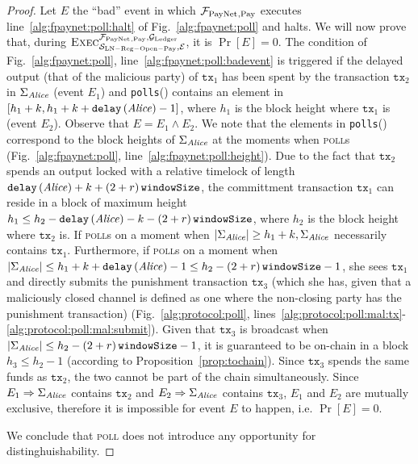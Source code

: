 \begin{proof}
  Let $E$ the ``bad'' event in which $\mathcal{F}_{\mathrm{PayNet}}{}_{\mathrm{, Pay}}$ executes
  line~\ref{alg:fpaynet:poll:halt} of Fig.~\ref{alg:fpaynet:poll} and halts. We
  will now prove that, during $\textsc{Exec}^{\mathcal{F}_{\mathrm{PayNet}}{}_{\mathrm{, Pay}},
  \mathcal{G}_{\mathrm{Ledger}}}_{\mathcal{S}_{\mathrm{LN - Reg - Open - Pay}}, \mathcal{E}}$, it is
  $\Pr[E] = 0$. The condition of Fig.~\ref{alg:fpaynet:poll},
  line~\ref{alg:fpaynet:poll:badevent} is triggered if the delayed output (that
  of the malicious party) of $\mathtt{tx}_1$ has been spent by the transaction
  $\mathtt{tx}_2$ in $\Sigma_{\mathit{Alice}}$ (event $E_1$) and \texttt{polls}(\alice)
  contains an element in $\left[h_1 + k, h_1 + k +
  \mathtt{delay}\left(\mathit{Alice}\right) - 1\right]$, where $h_1$ is the block height
  where $\mathtt{tx}_1$ is (event $E_2$). Observe that $E = E_1 \wedge E_2$. We
  note that the elements in \texttt{polls}(\alice) correspond to the block
  heights of $\Sigma_{\mathit{Alice}}$ at the moments when \alice{} \textsc{poll}s
  (Fig.~\ref{alg:fpaynet:poll}, line~\ref{alg:fpaynet:poll:height}). Due to the
  fact that $\mathtt{tx}_2$ spends an output locked with a relative timelock of
  length $\mathtt{delay}\left(\mathit{Alice}\right) + k + \left(2 + r\right)\texttt{windowSize}$, the committment
  transaction $\mathtt{tx}_1$ can reside in a block of maximum height $h_1 \leq
  h_2 - \mathtt{delay}\left(\mathit{Alice}\right) - k - \left(2 + r\right)\texttt{windowSize}$, where $h_2$ is the
  block height where $\mathtt{tx}_2$ is. If \alice{} \textsc{poll}s on a moment
  when $|\Sigma_{\mathit{Alice}}| \geq h_1 + k, \Sigma_{\mathit{Alice}}$ necessarily contains
  $\mathtt{tx}_1$. Furthermore, if \alice{} \textsc{poll}s on a moment when
  $|\Sigma_{\mathit{Alice}}| \leq h_1 + k + \mathtt{delay}\left(\mathit{Alice}\right) - 1 \leq
  h_2 - \left(2 + r\right)\texttt{windowSize}{} - 1$, she sees $\mathtt{tx}_1$ and directly submits the
  punishment transaction $\mathtt{tx}_3$ (which she has, given that a
  maliciously closed channel is defined as one where the non-closing party has
  the punishment transaction) (Fig.~\ref{alg:protocol:poll},
  lines~\ref{alg:protocol:poll:mal:tx}-\ref{alg:protocol:poll:mal:submit}).
  Given that $\mathtt{tx}_3$ is broadcast when $|\Sigma_{\mathit{Alice}}| \leq h_2 -
  \left(2 + r\right)\texttt{windowSize}{} - 1$, it is guaranteed to be on-chain in a block $h_3 \leq h_2 -
  1$ (according to Proposition~\ref{prop:tochain}). Since $\mathtt{tx}_3$ spends
  the same funds as $\mathtt{tx}_2$, the two cannot be part of the chain
  simultaneously. Since $E_1 \Rightarrow \Sigma_{\mathit{Alice}}$ contains
  $\mathtt{tx}_2$ and $E_2 \Rightarrow \Sigma_{\mathit{Alice}}$ contains
  $\mathtt{tx}_3$, $E_1$ and $E_2$ are mutually exclusive, therefore it is
  impossible for event $E$ to happen, i.e. $\Pr\left[E\right] = 0$.

  We conclude that \textsc{poll} does not introduce any opportunity for
  distinghuishability.

\end{proof}
